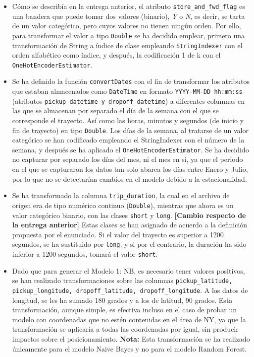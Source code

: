 \documentclass[12pt]{article}
\begin{document}
\begin{itemize}
    \item Cómo se describía en la entrega anterior, el atributo \texttt{store\_and\_fwd\_flag} es una bandera que puede tomar dos valores (binario), \textit{Y} o \textit{N}, es decir, se tarta de un valor categórico, pero cuyos valores no tienen ningún orden. Por ello, para transformar el valor a tipo \texttt{Double} se ha decidido emplear, primero una transformación de String a índice de clase empleando \texttt{StringIndexer} con el orden alfabético como índice, y después, la codificación 1 de k con el \texttt{OneHotEncoderEstimator}.
    \item Se ha definido la función \texttt{convertDates} con el fin de transformar los atributos que estaban almacenados como \texttt{DateTime} en formato \texttt{YYYY-MM-DD hh:mm:ss} (atributos \texttt{pickup\_datetime y dropoff\_datetime}) a diferentes columnas en las que se almacenan por separado el día de la semana con el que se corresponde el trayecto. Así como las horas, minutos y segundos (de inicio y fin de trayecto) en tipo \texttt{Double}. Los días de la semana, al tratarse de un valor categórico se han codificado empleando el StringIndexer con el número de la semana, y después se ha aplicado el \texttt{OneHotEncoderEstimator}. Se ha decidido no capturar por separado los días del mes, ni el mes en si, ya que el periodo en el que se capturaron los datos tan solo abarca los días entre Enero y Julio, por lo que no se detectarían cambios en el modelo debido a la estacionalidad.
    \item Se ha transformado la columna \texttt{trip\_duration}, la cual en el archivo de origen era de tipo numérico continuo (\texttt{Double}), mientras que ahora es un valor categórico binario, con las clases \texttt{short} y \texttt{long}. \textbf{[Cambio respecto de la entrega anterior]} Estas clases se han asignado de acuerdo a la definición propuesta por el enunciado. Si el valor del trayecto es superior a 1200 segundos, se ha sustituido por \texttt{long}, y si por el contrario, la duración ha sido inferior a 1200 segundos, tomará el valor \texttt{short}.
    \item Dado que para generar el Modelo 1: NB, es necesario tener valores positivos, se han realizado transformaciones sobre las columnas \texttt{pickup\_latitude, pickup\_longitude, dropoff\_latitude, dropoff\_longitude}. A los datos de longitud, se les ha sumado 180 grados y a los de latitud, 90 grados. Esta transformación, aunque simple, es efectiva incluso en el caso de probar un modelo con coordenadas que no estén contenidas en el área de NY, ya que la transformación se aplicaría a todas las coordenadas por igual, sin producir impactos sobre el posicionamiento. \textbf{Nota:} Esta transformación se ha realizado únicamente para el modelo Naive Bayes y no para el modelo Random Forest.
\end{itemize}
\end{document}
